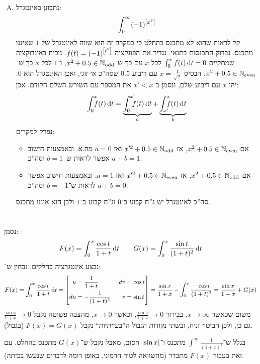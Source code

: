\documentclass[]{../../../../tex/classes/homework}
\newcommand\udv[4]{\csb{\begin{aligned}
			u &= #1  \ & dv &= #2 \\
			du &= #3 \ & v &= #4
\end{aligned}}}
\begin{document}
\begin{enumerate}[(A)]
\begin{itemize}
			\end{itemize}
		\item נתבונן באינטגרל: 
			\[ \int^{\infty}_0(-1)^{\left [ x^{2} \right ]} \]
			קל לראות שהוא לא מתכנס בהחלט כי במקרה זה הוא שווה לאינטגרל של $1$ שאיננו מתכנס. נבדוק התכנסות בתנאי. נגדיר את הפונקציה $f(t) = (-1)^{\left [ t^{2} \right ]}$. נוכיח באינדוקציה שמתקיים $\int^{x}_0 f(t)\,\mathrm{d}t = 0$ לכל $x$ עם כך ש־$x^{2} + 0.5 \in \mathbb{N}_{\mathrm{odd }}$, ו־$1$ לכל $x$ כך ש־$x^{2} + 0.5 \in \mathbb{N}_{\mathrm{even}}$. הבסיס $x = \frac{1}{\sqrt 2}$ עם ריבוע $0.5$ שסה''כ אי זוגי, ואכן האינטגרל הוא $0$. יהי $x$ עם ריבוע שלם, ונסמן ב־$x' < x$  את המספר עם השורש השלם הקודם. אכן: 
			\[ \int^{x}_0\dequad \ f(t)\dt = \underbrace{\int_{0}^{x'}\dequad \ f(t)\dt}_a + \underbrace{\int_{x'}^{x}\dequad \ f(t)\dt}_b \]
			נפרק למקרים: 
			\begin{itemize}
				\item אם $x^{2} + 0.5 \in \mathbb{N}_{\mathrm{even}}$, אז $x'^{2} + 0. 5 \in \mathbb{N}_{\mathrm{odd }}$ ואז $a = 0$ מה.א. ובאמצעות חישוב אפשר לראות ש–$b = 1$ וסה''כ $a + b = 1$. 
				\item אם $x^{2} + 0.5 \in \mathbb{N}_{\mathrm{odd }}$, אז $x'^{2} + 0.5 \in \mathbb{N}_{\mathrm{even}}$ ואז $a = 1$, ובאמצעות חישוב אפשר לראות ש־$b = -1$ וסה''כ $a + b = 0$. 
			\end{itemize}
			סה''כ לאינטגרל יש ג''ח קבוע ב־$0$ וג''ח קבוע ב־$1$ ולכן הוא איננו מתכנס. 
	\end{enumerate}
	
	\section{}
	נסמן: 
	\[ F(x) = \int^{x}_0 \frac{\cos t}{1 + t}\,\mathrm{d}t \quad \quad G(x) = \int^{x}_0 \frac{\sin t}{(1 + t)^{2}}\,\mathrm{d}t \]
	נבצע אינטגרציה בחלקים. נבחין ש־: 
	\[ F(x) = \int^{x}_0 \frac{\cos t}{1 + t}\dt = \udv{\frac{1}{1 + t}}{\cos t}{-\frac{1}{(1 + t)^{2}}}{\sin t} = \frac{\sin x}{1 + x} - \int^{x}_0 \frac{- \cos t}{(1 + t)^{2}} = \frac{\sin x}{1 + x} + G(x) \]
	משום שכאשר $x \to \infty$, בבירור $\frac{\sin x}{1 + x} \to 0$, וכאשר $x \to 0$, מהצבה פשוטה נקבל $\frac{\sin x}{1 + x} \to 0$ גם כן, ולכן הביטוי זניח, ובשתי נקודות הגבול ה''בעייתיות`` נקבל $F(x) = G(x)$ (בגבול). 
	
	בגלל ש־$\int^{\infty} \frac{1}{(1 + x)^{2}}$ מתכנס ו־$\left \lvert \sin x \right \rvert$ חסום, מאבל נקבל ש־$G(x)$ מתכנס בהחלט. עם זאת בעבור $F(x)$ מתבדר (מהשוואה לטור הרמוני, באופן דומה לדברים שנעשו בכיתה). 
	
\end{document}
